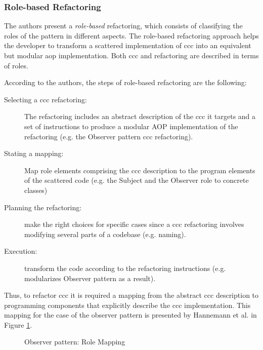 \subsubsection{Role-based Refactoring}
The authors present a \textit{role-based} refactoring, which consists of classifying the roles of the pattern in different aspects.
The role-based refactoring approach helps the developer to transform a scattered implementation of \ac{ccc} into an equivalent but modular \ac{aop} implementation. 
Both \ac{ccc} and refactoring are described in terms of roles. 

According to the authors\cite{hannemann2005role}, the steps of role-based refactoring are the following:
\begin{description}

	\item [Selecting a \ac{ccc} refactoring:] The refactoring includes an abstract description of the \ac{ccc} it targets and a set of instructions to produce a modular AOP implementation of the refactoring (e.g. the Observer pattern \ac{ccc} refactoring).

	\item [Stating a mapping:] Map role elements comprising the \ac{ccc} description to the program elements of the scattered code (e.g. the Subject and the Observer role to concrete classes)

	\item [Planning the refactoring:] make the right choices for specific cases since a \ac{ccc} refactoring involves modifying several parts of a codebase (e.g. naming).

	\item [Execution:] transform the code according to the refactoring instructions (e.g. modularizes Observer pattern as a result).
\end{description}

Thus, to refactor \ac{ccc} it is required a mapping from the abstract \ac{ccc} description to programming components that explicitly describe the \ac{ccc} implementation.
This mapping for the case of the observer pattern is presented by Hannemann et al. \cite{hannemann2005role} in Figure \ref{fig:Observer_Role_Mapping}.

\begin{figure}[H]
	\centering
  	\caption{Observer pattern: Role Mapping \cite{hannemann2005role}}
  	\label{fig:Observer_Role_Mapping}
\end{figure}

